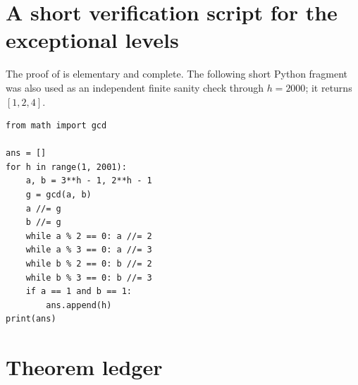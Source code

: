 \documentclass[11pt]{article}
\numberwithin{equation}{section}
\theoremstyle{definition}
\theoremstyle{remark}
\begin{document}
\section{A short verification script for the exceptional levels}

The proof of  is elementary and complete.  The following short Python fragment was also used as an independent finite sanity check through $h=2000$; it returns $[1,2,4]$.

\begin{verbatim}
from math import gcd

ans = []
for h in range(1, 2001):
    a, b = 3**h - 1, 2**h - 1
    g = gcd(a, b)
    a //= g
    b //= g
    while a % 2 == 0: a //= 2
    while a % 3 == 0: a //= 3
    while b % 2 == 0: b //= 2
    while b % 3 == 0: b //= 3
    if a == 1 and b == 1:
        ans.append(h)
print(ans)
\end{verbatim}

\section{Theorem ledger}
\end{document}
